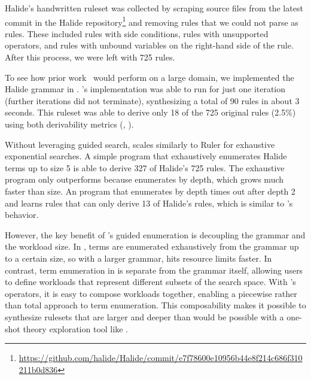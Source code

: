 Halide's handwritten ruleset was collected by scraping
source files from the latest commit in the Halide
  repository\footnote{\url{https://github.com/halide/Halide/commit/e7f78600e10956b44e8f214c686f310211b0d836}}
  and removing rules that we could not parse as \enumo rules.
These included rules with side conditions, rules with unsupported operators,
  and rules with unbound variables on the right-hand side of the rule.
After this process, we were left with 725 rules.

To see how prior work~\citep{ruler}
  would perform on a large domain,
  we implemented the Halide grammar in . 's
  implementation was able to run for
  just one iteration (further iterations did not terminate),
  synthesizing a total of 90 rules in about 3 seconds.
  This ruleset was able to derive
  only 18 of the 725 original rules (2.5\%)
   using both derivability metrics (\lhs, \lhsandrhs).

Without leveraging guided search, \enumo scales similarly to Ruler
  for exhaustive exponential searches.
A simple \enumo program that exhaustively enumerates Halide terms up to size
  5 is able to derive 327 of Halide's 725 rules.
The exhaustive \enumo program only outperforms  because 
  enumerates by depth, which grows much faster than size.
An \enumo program that enumerates by depth times out after depth 2 and learns
  rules that can only derive 13 of Halide's rules, which is similar to
  's behavior.

However, the key benefit of \enumo's guided enumeration is decoupling
  the grammar and the workload size.
In , terms are enumerated exhaustively from the grammar up to a
  certain size, so with a larger grammar,  hits resource limits
  faster.
In contrast, term enumeration in \enumo is separate from the
  grammar itself, allowing users to define workloads that represent
  different subsets of the search space.
With \enumo's operators, it is easy to compose workloads together,
  enabling a piecewise rather than total approach to term enumeration.
This composability makes it possible to synthesize rulesets that are
  larger and deeper than would be possible with a one-shot theory
  exploration tool like .


